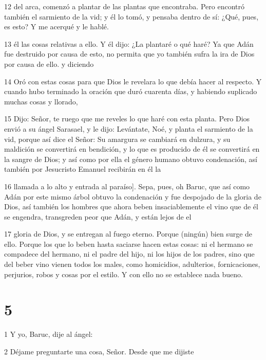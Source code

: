 \par 12 del arca, comenzó a plantar de las plantas que encontraba. Pero encontró también el sarmiento de la vid; y él lo tomó, y pensaba dentro de sí: ¿Qué, pues, es esto? Y me acerqué y le hablé.

\par 13 él las cosas relativas a ello. Y él dijo: ¿La plantaré o qué haré? Ya que Adán fue destruido por causa de esto, no permita que yo también sufra la ira de Dios por causa de ello. y diciendo

\par 14 Oró con estas cosas para que Dios le revelara lo que debía hacer al respecto. Y cuando hubo terminado la oración que duró cuarenta días, y habiendo suplicado muchas cosas y llorado,

\par 15 Dijo: Señor, te ruego que me reveles lo que haré con esta planta. Pero Dios envió a su ángel Sarasael, y le dijo: Levántate, Noé, y planta el sarmiento de la vid, porque así dice el Señor: Su amargura se cambiará en dulzura, y su maldición se convertirá en bendición, y lo que es producido de él se convertirá en la sangre de Dios; y así como por ella el género humano obtuvo condenación, así también por Jesucristo Emanuel recibirán en él la

\par 16 llamada a lo alto y entrada al paraíso]. Sepa, pues, oh Baruc, que así como Adán por este mismo árbol obtuvo la condenación y fue despojado de la gloria de Dios, así también los hombres que ahora beben insaciablemente el vino que de él se engendra, transgreden peor que Adán, y están lejos de el

\par 17 gloria de Dios, y se entregan al fuego eterno. Porque (ningún) bien surge de ello. Porque los que lo beben hasta saciarse hacen estas cosas: ni el hermano se compadece del hermano, ni el padre del hijo, ni los hijos de los padres, sino que del beber vino vienen todos los males, como homicidios, adulterios, fornicaciones, perjurios, robos y cosas por el estilo. Y con ello no se establece nada bueno.

\chapter{5}

\par 1 Y yo, Baruc, dije al ángel:

\par 2 Déjame preguntarte una cosa, Señor. Desde que me dijiste

